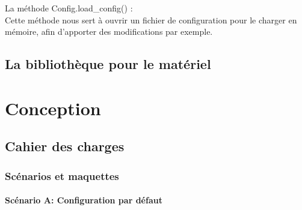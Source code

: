 \documentclass[16pts]{report}
\begin{document}
    La méthode Config.load\_config() :\\

        Cette méthode nous sert à ouvrir un fichier de configuration pour le charger
        en mémoire, afin d'apporter des modifications par exemple.\\


    \section{La bibliothèque pour le matériel}
    \label{sec:La bibliothèque pour le matériel}

\chapter{Conception}
\label{cha:Conception}
    \section{Cahier des charges}
    \label{sec:Cahier des charges}
        \subsection{Scénarios et maquettes}
        \label{sub:Scénarios et maquettes}

\subsubsection{Scénario A: Configuration par défaut}
\label{sssub:Scénario A: Configuration par défaut}
\end{document}

